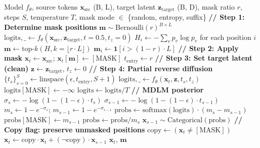 \documentclass{article}
\begin{document}
\begin{algorithm}[t]
\caption{LSME: Full Implementation with Mask Modes}
\label{alg:lsme_detailed}
\begin{algorithmic}[1]
\REQUIRE Model $f_\theta$, source tokens $\mathbf{x}_\text{src}$ (B, L), target latent $\mathbf{z}_\text{target}$ (B, D), mask ratio $r$, steps $S$, temperature $T$, mask mode $\in$ \{random, entropy, suffix\}
\STATE \textbf{// Step 1: Determine mask positions}
    \STATE $\mathbf{m} \sim \text{Bernoulli}(r)^{B \times L}$
    \STATE $\text{logits}, \_ \leftarrow f_\theta(\mathbf{x}_\text{src}, \mathbf{z}_\text{target}, t{=}0.5, t_z{=}0)$
    \STATE $H_i \leftarrow -\sum_v p_v \log p_v$ for each position $i$ 
    \STATE $\mathbf{m} \leftarrow \text{top-}k(H, k{=}\lfloor r \cdot L \rfloor)$ 
    \STATE $\mathbf{m}_i \leftarrow \mathbf{1}[i > (1-r) \cdot L]$ 
\ENDIF
\STATE \textbf{// Step 2: Apply mask}
\STATE $\mathbf{x}_t \leftarrow \mathbf{x}_\text{src}$; \quad $\mathbf{x}_t[\mathbf{m}] \leftarrow [\text{MASK}]$
\STATE $t_\text{entry} \leftarrow r$
\STATE \textbf{// Step 3: Set target latent (clean)}
\STATE $\mathbf{z} \leftarrow \mathbf{z}_\text{target}$, \quad $t_z \leftarrow 0$
\STATE \textbf{// Step 4: Partial reverse diffusion}
\STATE $\{t_s\}_{s=0}^{S} \leftarrow \text{linspace}(\epsilon, t_\text{entry}, S+1)$
    \STATE $\text{logits}, \_ \leftarrow f_\theta(\mathbf{x}_t, \mathbf{z}, t_s, t_z)$
    \STATE $\text{logits}[\text{MASK}] \leftarrow -\infty$ 
    \STATE $\text{logits} \leftarrow \text{logits} / T$ 
    \STATE \textbf{// MDLM posterior}
    \STATE $\sigma_s \leftarrow -\log(1 - (1-\epsilon) \cdot t_s)$
    \STATE $\sigma_{s-1} \leftarrow -\log(1 - (1-\epsilon) \cdot t_{s-1})$
    \STATE $m_s \leftarrow 1 - e^{-\sigma_s}$; \quad $m_{s-1} \leftarrow 1 - e^{-\sigma_{s-1}}$
    \STATE $\text{probs} \leftarrow \text{softmax}(\text{logits}) \cdot (m_s - m_{s-1})$
    \STATE $\text{probs}[\text{MASK}] \leftarrow m_{s-1}$
    \STATE $\text{probs} \leftarrow \text{probs} / m_s$
    \STATE $\mathbf{x}_{s-1} \sim \text{Categorical}(\text{probs})$
    \STATE \textbf{// Copy flag: preserve unmasked positions}
    \STATE $\text{copy} \leftarrow (\mathbf{x}_t \neq [\text{MASK}])$
    \STATE $\mathbf{x}_t \leftarrow \text{copy} \cdot \mathbf{x}_t + (\neg\text{copy}) \cdot \mathbf{x}_{s-1}$
\ENDFOR
\RETURN $\mathbf{x}_t$, $\mathbf{m}$ 
\end{algorithmic}
\end{algorithm}
\end{document}
